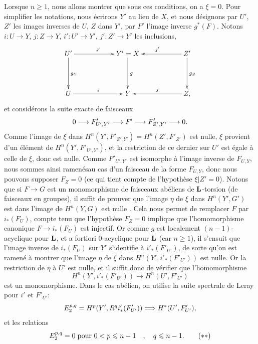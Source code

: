 \documentclass[10pt]{../fichiers-configuration-latex/smfart}
\begin{document}
Lorsque $n\geq 1$, nous allons montrer que sous ces conditions, on a
$\xi=0$. Pour simplifier les notations, nous écrirons $Y'$ au lieu de
$X$, et nous désignons par $U'$, $Z'$ les images inverses de $U$, $Z$
dans $Y'$, par $F'$ l'image inverse $g^{\ast}(F)$. Notons
$i:U\rightarrow Y$, $j:Z\rightarrow Y$, $i':U'\rightarrow Y'$,
$j':Z'\rightarrow Y'$ les inclusions,
$$
\xymatrix@C=2cm@R=1.5cm{
U'  \ar[r]^{i'} \ar[d]^{g_U}& Y' = X  \ar[d]^{g} & Z'  \ar[l]_{j'} \ar[d]^{g_Z}\\
U   \ar[r]^{i} & Y & Z \ar[l]_{j},
}
$$
et considérons la suite exacte de faisceaux
$$
0\longrightarrow F'_{U',Y'}\longrightarrow F'\longrightarrow
F'_{Z',Y'}\longrightarrow 0{}.
$$
Comme l'image de $\xi$ dans $H^{n}(Y',F'_{Z',Y'})=H^{n}(Z',F'_{Z'})$
est nulle, $\xi$ provient d'un élément de $H^{n}(Y',F'_{U',Y'})$, et
la restriction de ce dernier sur $U'$ est égale à celle de $\xi$, donc
est nulle. Comme $F'_{U',Y'}$ est isomorphe à l'image inverse de
$F_{U,Y}$, nous sommes ainsi ramenés\pageoriginale au cas d'un
faisceau de la forme $F_{U,Y}$, donc nous pouvons supposer $F_Z=0$ (ce
qui tient compte de l'hypothèse $\xi|Z'=0$). Notons que si
$F\rightarrow G$ est un monomorphisme de faisceaux abéliens de
$\mathbf{L}$-torsion (\resp de faisceaux en groupes), il suffit de
prouver que l'image $\eta$ de $\xi$ dans $H^{n}(Y', G')$ est dans
l'image de $H^{n}(Y,G)$ \ie est nulle . Cela nous permet de
remplacer $F$ par $i_{\ast}(F_U)$, compte tenu que l'hypothèse $F_Z=0$
implique que l'homomorphisme canonique $F\rightarrow i_{\ast}(F_U)$
est injectif. Or comme $g$ est localement $(n-1)$-acyclique pour
$\mathbf{L}$, et a fortiori $0$-acyclique pour $\mathbf{L}$ (car
$n\geq 1$), il s'ensuit que l'image inverse de $i_{\ast}(F_U)$ sur
$Y'$ s'identifie à $i'_{\ast}(F'_{U'})$, de sorte qu'on est ramené à
montrer que l'image $\eta$ de $\xi$ dans
$H^{n}(Y',i'_{\ast}(F'_{U'}))$ est nulle. Or la restriction de $\eta$
à $U'$ est nulle, et il suffit donc de vérifier que l'homomorphisme
\begin{equation*}
H^{n}(Y',i'_{\ast}(F'_{U'}))\longrightarrow H^{n}(U',F'_{U'})\tag{$\ast$}
\end{equation*}
est un monomorphisme. Dans le cas abélien, on utilise la suite
spectrale de Leray pour $i'$ et $F'_{U'}$:
$$
E^{p,q}_2=H^p(Y',R^qi'_{\ast}(F'_{U'}))\Longrightarrow
H^{\ast}(U',F'_{U'}){},
$$
et les relations
\begin{equation*}
E^{p,q}_2=0\; \mbox{\rm pour } 0<p\leq n-1\quav q\leq n-1{\quoi}.\tag{${\ast}{\ast}$}
\end{equation*}
\end{document}
